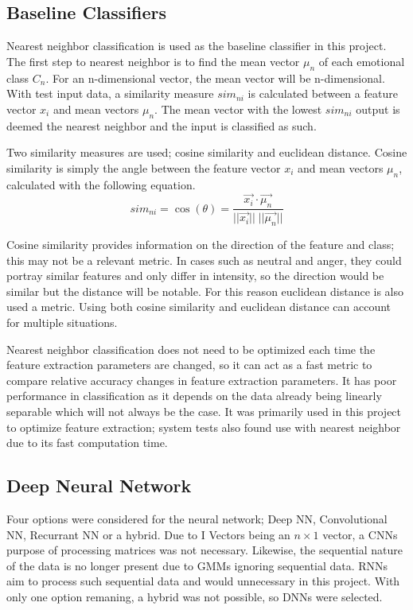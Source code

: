 \subsection{Baseline Classifiers}
	Nearest neighbor classification is used as the baseline classifier in this project. The first step to nearest neighbor is to find the mean vector $\mu_n$ of each emotional class $C_n$. For an n-dimensional vector, the mean vector will be n-dimensional. With test input data, a similarity measure $sim_{ni}$ is calculated between a feature vector $x_i$ and mean vectors $\mu_n$. The mean vector with the lowest $sim_{ni}$ output is deemed the nearest neighbor and the input is classified as such.
	
	Two similarity measures are used; cosine similarity and euclidean distance. Cosine similarity is simply the angle between the feature vector $x_i$ and mean vectors $\mu_n$, calculated with the following equation.
	\begin{equation}
		sim_{ni} = \cos(\theta) = \frac{\vec{x_i} \cdot \vec{\mu_n}}{\lvert\lvert \vec{x_i} \rvert\rvert \; \lvert\lvert \vec{\mu_n} \rvert\rvert}
	\end{equation}
	
	Cosine similarity provides information on the direction of the feature and class; this may not be a relevant metric. In cases such as neutral and anger, they could portray similar features and only differ in intensity, so the direction would be similar but the distance will be notable. For this reason euclidean distance is also used a metric. Using both cosine similarity and euclidean distance can account for multiple situations. 
	
	Nearest neighbor classification does not need to be optimized each time the feature extraction parameters are changed, so it can act as a fast metric to compare relative accuracy changes in feature extraction parameters. It has poor performance in classification as it depends on the data already being linearly separable which will not always be the case. It was primarily used in this project to optimize feature extraction; system tests also found use with nearest neighbor due to its fast computation time.
\subsection{Deep Neural Network}
	Four options were considered for the neural network; Deep NN, Convolutional NN, Recurrant NN or a hybrid. Due to I Vectors being an $n \times 1$ vector, a CNNs purpose of processing matrices was not necessary. Likewise, the sequential nature of the data is no longer present due to GMMs ignoring sequential data. RNNs aim to process such sequential data and would unnecessary in this project. With only one option remaning, a hybrid was not possible, so DNNs were selected.
	
